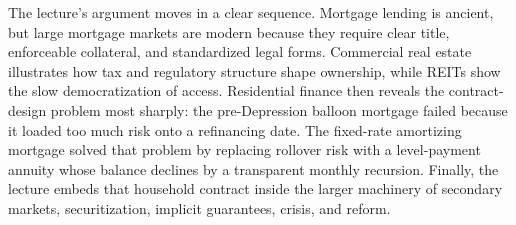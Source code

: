 The lecture's argument moves in a clear sequence. Mortgage lending is ancient, but large mortgage markets are modern because they require clear title, enforceable collateral, and standardized legal forms. Commercial real estate illustrates how tax and regulatory structure shape ownership, while REITs show the slow democratization of access. Residential finance then reveals the contract-design problem most sharply: the pre-Depression balloon mortgage failed because it loaded too much risk onto a refinancing date. The fixed-rate amortizing mortgage solved that problem by replacing rollover risk with a level-payment annuity whose balance declines by a transparent monthly recursion. Finally, the lecture embeds that household contract inside the larger machinery of secondary markets, securitization, implicit guarantees, crisis, and reform.